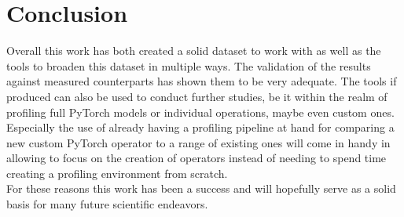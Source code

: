 \documentclass[conference]{IEEEtran}
\begin{document}
\section{Conclusion}
Overall this work has both created a solid dataset to work with as well as the tools to broaden this dataset in multiple ways. The validation of the results against measured counterparts has shown them to be very adequate. The tools if produced can also be used to conduct further studies, be it within the realm of profiling full PyTorch models or individual operations, maybe even custom ones. \\
Especially the use of already having a profiling pipeline at hand for comparing a new custom PyTorch operator to a range of existing ones will come in handy in allowing to focus on the creation of operators instead of needing to spend time creating a profiling environment from scratch. \\
For these reasons this work has been a success and will hopefully serve as a solid basis for many future scientific endeavors. 

%
% 
% 
\end{document}
